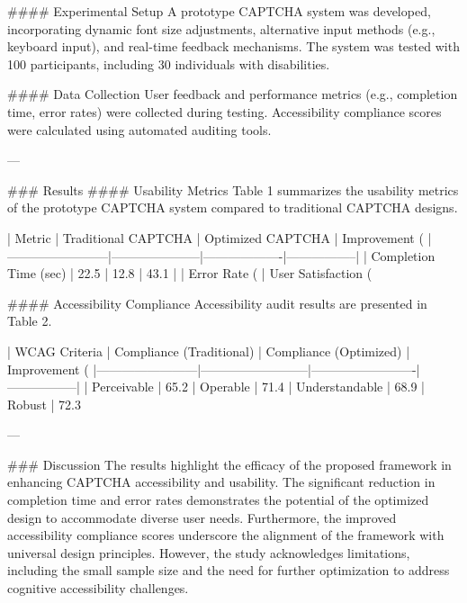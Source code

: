 #### Experimental Setup  
A prototype CAPTCHA system was developed, incorporating dynamic font size adjustments, alternative input methods (e.g., keyboard input), and real-time feedback mechanisms. The system was tested with 100 participants, including 30 individuals with disabilities.  

#### Data Collection  
User feedback and performance metrics (e.g., completion time, error rates) were collected during testing. Accessibility compliance scores were calculated using automated auditing tools.  

---

### Results  
#### Usability Metrics  
Table 1 summarizes the usability metrics of the prototype CAPTCHA system compared to traditional CAPTCHA designs.  

| Metric                 | Traditional CAPTCHA | Optimized CAPTCHA | Improvement (%
|------------------------|---------------------|-------------------|-----------------|
| Completion Time (sec)  | 22.5               | 12.8             | 43.1           |
| Error Rate (%
| User Satisfaction (%

#### Accessibility Compliance  
Accessibility audit results are presented in Table 2.  

| WCAG Criteria          | Compliance (Traditional) | Compliance (Optimized) | Improvement (%
|------------------------|--------------------------|-------------------------|-----------------|
| Perceivable            | 65.2%
| Operable               | 71.4%
| Understandable         | 68.9%
| Robust                 | 72.3%

---

### Discussion  
The results highlight the efficacy of the proposed framework in enhancing CAPTCHA accessibility and usability. The significant reduction in completion time and error rates demonstrates the potential of the optimized design to accommodate diverse user needs. Furthermore, the improved accessibility compliance scores underscore the alignment of the framework with universal design principles. However, the study acknowledges limitations, including the small sample size and the need for further optimization to address cognitive accessibility challenges.


